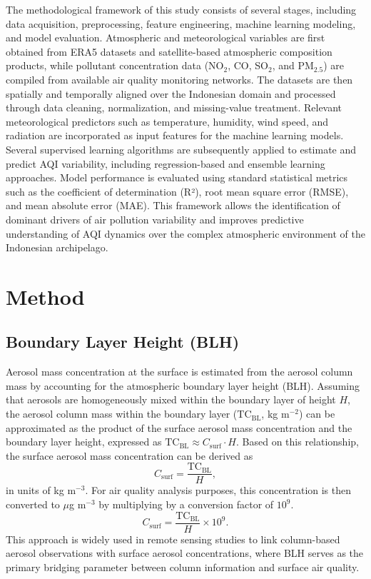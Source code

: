 \documentclass[review,12pt]{elsarticle}
\begin{document}
The methodological framework of this study consists of several stages, including data acquisition, preprocessing, feature engineering, machine learning modeling, and model evaluation. Atmospheric and meteorological variables are first obtained from ERA5 datasets and satellite-based atmospheric composition products, while pollutant concentration data (NO$_2$, CO, SO$_2$, and PM$_{2.5}$) are compiled from available air quality monitoring networks. The datasets are then spatially and temporally aligned over the Indonesian domain and processed through data cleaning, normalization, and missing-value treatment. Relevant meteorological predictors such as temperature, humidity, wind speed, and radiation are incorporated as input features for the machine learning models. Several supervised learning algorithms are subsequently applied to estimate and predict AQI variability, including regression-based and ensemble learning approaches. Model performance is evaluated using standard statistical metrics such as the coefficient of determination (R²), root mean square error (RMSE), and mean absolute error (MAE). This framework allows the identification of dominant drivers of air pollution variability and improves predictive understanding of AQI dynamics over the complex atmospheric environment of the Indonesian archipelago.


\section{Method}
\label{sec2}


\subsection{Boundary Layer Height (BLH)}
Aerosol mass concentration at the surface is estimated from the aerosol column mass by accounting for the atmospheric boundary layer height (BLH). Assuming  that aerosols are homogeneously mixed within the boundary layer of height $H$, the aerosol column mass within the boundary layer ($\mathrm{TC}_{\mathrm{BL}}$, kg m$^{-2}$) can be approximated as the product of the surface aerosol mass 
concentration and the boundary layer height, expressed as  $\mathrm{TC}_{\mathrm{BL}} \approx C_{\mathrm{surf}} \cdot H$. Based on this relationship, the surface aerosol mass concentration can be derived as
\begin{equation}
C_{\mathrm{surf}} = \frac{\mathrm{TC}_{\mathrm{BL}}}{H},
\end{equation}
in units of kg m$^{-3}$. For air quality analysis purposes, this concentration is then converted to $\mu$g m$^{-3}$ by multiplying by a conversion factor of $10^{9}$.
\begin{equation}
C_{\mathrm{surf}} = \frac{\mathrm{TC}_{\mathrm{BL}}}{H} \times 10^{9}.
\end{equation}
This approach is widely used in remote sensing studies to link column-based aerosol observations with surface aerosol concentrations, where BLH serves as the primary bridging parameter between column information and surface air quality.
\end{document}
